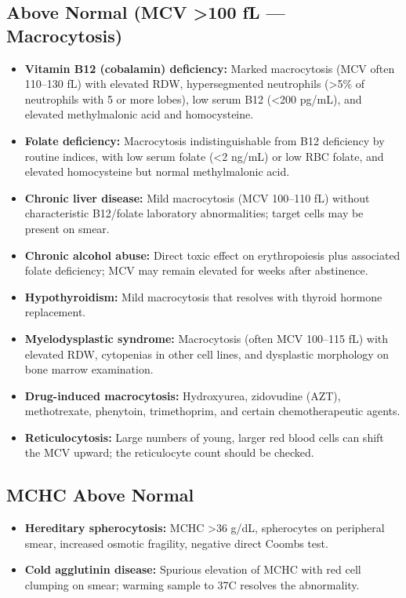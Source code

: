 \subsection*{Above Normal (MCV >100 fL --- Macrocytosis)}
\begin{itemize}
  \item \textbf{Vitamin B12 (cobalamin) deficiency:} Marked macrocytosis (MCV often 110--130 fL) with elevated RDW, hypersegmented neutrophils (>5\% of neutrophils with 5 or more lobes), low serum B12 (<200 pg/mL), and elevated methylmalonic acid and homocysteine.
  \item \textbf{Folate deficiency:} Macrocytosis indistinguishable from B12 deficiency by routine indices, with low serum folate (<2 ng/mL) or low RBC folate, and elevated homocysteine but normal methylmalonic acid.
  \item \textbf{Chronic liver disease:} Mild macrocytosis (MCV 100--110 fL) without characteristic B12/folate laboratory abnormalities; target cells may be present on smear.
  \item \textbf{Chronic alcohol abuse:} Direct toxic effect on erythropoiesis plus associated folate deficiency; MCV may remain elevated for weeks after abstinence.
  \item \textbf{Hypothyroidism:} Mild macrocytosis that resolves with thyroid hormone replacement.
  \item \textbf{Myelodysplastic syndrome:} Macrocytosis (often MCV 100--115 fL) with elevated RDW, cytopenias in other cell lines, and dysplastic morphology on bone marrow examination.
  \item \textbf{Drug-induced macrocytosis:} Hydroxyurea, zidovudine (AZT), methotrexate, phenytoin, trimethoprim, and certain chemotherapeutic agents.
  \item \textbf{Reticulocytosis:} Large numbers of young, larger red blood cells can shift the MCV upward; the reticulocyte count should be checked.
\end{itemize}

\subsection*{MCHC Above Normal}
\begin{itemize}
  \item \textbf{Hereditary spherocytosis:} MCHC >36 g/dL, spherocytes on peripheral smear, increased osmotic fragility, negative direct Coombs test.
  \item \textbf{Cold agglutinin disease:} Spurious elevation of MCHC with red cell clumping on smear; warming sample to 37\textdegree{}C resolves the abnormality.
\end{itemize}

